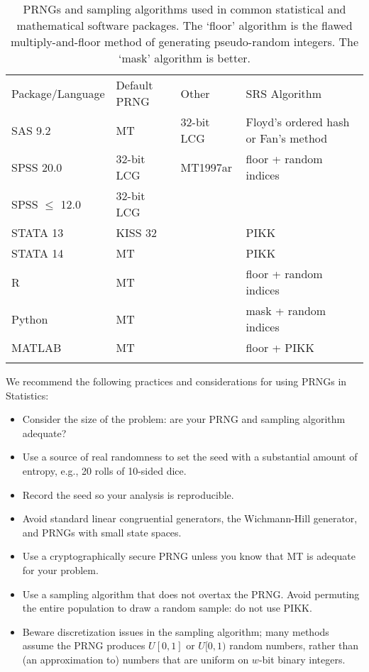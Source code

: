 \documentclass[graybox]{svmult}
\begin{document}
\begin{table}
\caption{PRNGs and sampling algorithms used in common statistical and mathematical software packages. The `floor' algorithm is the flawed multiply-and-floor method of generating pseudo-random integers. The `mask' algorithm is better.}
\label{tab:software}      
\begin{tabular}[h]{p{2.5cm}p{2.2cm}p{1.8cm}p{4.9cm}}
\hline\noalign{\smallskip}
Package/Language & Default PRNG & Other & SRS Algorithm  \\
\noalign{\smallskip}\svhline\noalign{\smallskip}
SAS 9.2              & MT         	& 32-bit LCG & Floyd's ordered hash or Fan's method \cite{fan_development_1962} \\
SPSS 20.0          & 32-bit LCG  & MT1997ar  & floor + random indices \\
SPSS $\le$ 12.0 & 32-bit LCG  &         &                \\
STATA 13            & KISS 32      &         & PIKK           \\
STATA 14            & MT              &         & PIKK           \\
R                         & MT              &         & floor + random indices \\
Python                 & MT             &         & mask + random indices  \\
MATLAB              & MT             &         & floor + PIKK         \\
\noalign{\smallskip}\hline\noalign{\smallskip}
\end{tabular}
\end{table}


We recommend the following practices and considerations for using PRNGs in Statistics:
\begin{itemize}
\item Consider the size of the problem: are your PRNG and sampling algorithm adequate?
\item Use a source of real randomness to set the seed with a substantial amount of entropy, e.g., 20 rolls of 10-sided dice.
\item Record the seed so your analysis is reproducible.
\item Avoid standard linear congruential generators, the Wichmann-Hill generator, and PRNGs with small state spaces.
\item Use a cryptographically secure PRNG unless you know that MT is adequate for your problem.
\item Use a sampling algorithm that does not overtax the PRNG. Avoid permuting the entire population to draw a random sample: do not use PIKK.
\item Beware discretization issues in the sampling algorithm; many methods assume the PRNG produces $U[0,1]$ or $U[0,1)$ random numbers, rather than (an approximation to) numbers that are uniform on $w$-bit binary integers.
\end{itemize}
\end{document}
